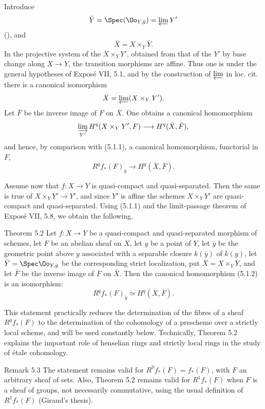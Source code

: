 Introduce
\[
\bar Y=\Spec(\Oo_{Y,\bar y})=\varprojlim Y'
\]
(), and
\[
\bar X=X\times_Y\bar Y.
\]
In the projective system of the \(X\times_YY'\), obtained from that of the \(Y'\) by base change along \(X\to Y\), the transition morphisms are affine. Thus one is under the general hypotheses of Expos\'e VII, 5.1, and by the construction of \(\varprojlim\) in loc. cit. there is a canonical isomorphism
\[
\bar X=\varprojlim (X\times_YY').
\]
Let \(\bar F\) be the inverse image of \(F\) on \(\bar X\). One obtains a canonical homomorphism
\[
\varinjlim_{Y'} H^q(X\times_YY',F)\longrightarrow H^q(\bar X,\bar F),
\]
and hence, by comparison with (5.1.1), a canonical homomorphism, functorial in \(F\),
\[
R^qf_*(F)_{\bar y}\longrightarrow H^q(\bar X,\bar F).
\tag{5.1.2}
\]

Assume now that \(f:X\to Y\) is quasi-compact and quasi-separated. Then the same is true of \(X\times_YY'\to Y'\), and since \(Y'\) is affine the schemes \(X\times_YY'\) are quasi-compact and quasi-separated. Using (5.1.1) and the limit-passage theorem of Expos\'e VII, 5.8, we obtain the following.

\begin{statement}{Theorem 5.2}
Let \(f:X\to Y\) be a quasi-compact and quasi-separated morphism of schemes, let \(F\) be an abelian sheaf on \(X\), let \(y\) be a point of \(Y\), let \(\bar y\) be the geometric point above \(y\) associated with a separable closure \(k(\bar y)\) of \(k(y)\), let \(\bar Y=\Spec\Oo_{Y,\bar y}\) be the corresponding strict localization, put \(\bar X=X\times_Y\bar Y\), and let \(\bar F\) be the inverse image of \(F\) on \(\bar X\). Then the canonical homomorphism (5.1.2) is an isomorphism:
\[
R^qf_*(F)_{\bar y}\simeq H^q(\bar X,\bar F).
\]
\end{statement}

This statement practically reduces the determination of the fibres of a sheaf \(R^qf_*(F)\) to the determination of the cohomology of a prescheme over a strictly local scheme, and will be used constantly below. Technically, Theorem 5.2 explains the important role of henselian rings and strictly local rings in the study of \'etale cohomology.

\begin{remarktext}{Remark 5.3}
The statement remains valid for \(R^0f_*(F)=f_*(F)\), with \(F\) an arbitrary sheaf of sets. Also, Theorem 5.2 remains valid for \(R^1f_*(F)\) when \(F\) is a sheaf of groups, not necessarily commutative, using the usual definition of \(R^1f_*(F)\) (\cf Giraud's thesis).
\end{remarktext}


